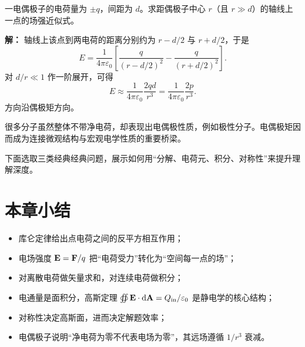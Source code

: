 \begin{example}[电偶极子轴线上远处场强估算]
一电偶极子的电荷量为 $\pm q$，间距为 $d$。求距偶极子中心 $r$（且 $r\gg d$）的轴线上一点的场强近似式。

\textbf{解：} 轴线上该点到两电荷的距离分别约为 $r-d/2$ 与 $r+d/2$，于是
\begin{equation}
E = \frac{1}{4\pi\varepsilon_0}\left[\frac{q}{(r-d/2)^2}-\frac{q}{(r+d/2)^2}\right].
\end{equation}
对 $d/r\ll 1$ 作一阶展开，可得
\begin{equation}
E \approx \frac{1}{4\pi\varepsilon_0}\frac{2qd}{r^3}
= \frac{1}{4\pi\varepsilon_0}\frac{2p}{r^3}.
\end{equation}
方向沿偶极矩方向。
\end{example}

\begin{remark}
很多分子虽然整体不带净电荷，却表现出电偶极性质，例如极性分子。电偶极矩因而成为连接微观结构与宏观电学性质的重要桥梁。
\end{remark}

下面选取三类经典经典问题，展示如何用“分解、电荷元、积分、对称性”来提升理解深度。

\section*{本章小结}

\begin{itemize}
  \item 库仑定律给出点电荷之间的反平方相互作用；
  \item 电场强度 $\vb{E}=\vb{F}/q$ 把“电荷受力”转化为“空间每一点的场”；
  \item 对离散电荷做矢量求和，对连续电荷做积分；
  \item 电通量是面积分，\;高斯定理 $\oiint \vb{E}\cdot\dd\vb{A}=Q_{\text{in}}/\varepsilon_0$ 是静电学的核心结构；
  \item 对称性决定高斯面，进而决定解题效率；
  \item 电偶极子说明“净电荷为零不代表电场为零”，其远场遵循 $1/r^3$ 衰减。
\end{itemize}

